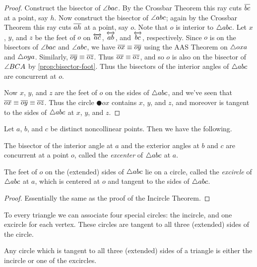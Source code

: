 \begin{proof}
Construct the bisector of \(\angle{bac}\).
By the Crossbar Theorem this ray cuts \(\overline{bc}\) at a point, say \(h\).
Now construct the bisector of \(\angle{abc}\); again by the Crossbar Theorem this ray cuts \(\overline{ah}\) at a point, say \(o\).
Note that \(o\) is interior to \(\bigtriangleup{abc}\).
Let \(x\), \(y\), and \(z\) be the feet of \(o\) on \(\overleftrightarrow{ac}\), \(\overleftrightarrow{ab}\), and \(\overleftrightarrow{bc}\), respectively.
Since \(o\) is on the bisectors of \(\angle{bac}\) and \(\angle{abc}\), we have \(\overline{ox} \equiv \overline{oy}\) using the AAS Theorem on \(\bigtriangleup{oxa}\) and \(\bigtriangleup{oya}\).
Similarly, \(\overline{oy} \equiv \overline{oz}\).
Thus \(\overline{ox} \equiv \overline{oz}\), and so \(o\) is also on the bisector of \(\angle{BCA}\) by \ref{prop:bisector-foot}.
Thus the bisectors of the interior angles of \(\bigtriangleup{abc}\) are concurrent at \(o\).

Now \(x\), \(y\), and \(z\) are the feet of \(o\) on the sides of \(\bigtriangleup{abc}\), and we've seen that \(\overline{ox} \equiv \overline{oy} \equiv \overline{oz}\).
Thus the circle \(\CIRCLE{o}{x}\) contains \(x\), \(y\), and \(z\), and moreover is tangent to the sides of \(\bigtriangleup{abc}\) at \(x\), \(y\), and \(z\).
\end{proof}

\begin{construct}
Let \(a\), \(b\), and \(c\) be distinct noncollinear points.
Then we have the following.
\begin{proplist}
\item The bisector of the interior angle at \(a\) and the exterior angles at \(b\) and \(c\) are concurrent at a point \(o\), called the \emph{excenter} of \(\bigtriangleup{abc}\) at \(a\).

\item The feet of \(o\) on the (extended) sides of \(\bigtriangleup{abc}\) lie on a circle, called the \emph{excircle} of \(\bigtriangleup{abc}\) at \(a\), which is centered at \(o\) and tangent to the sides of \(\bigtriangleup{abc}\).
\end{proplist}
\end{construct}

\begin{proof}
Essentially the same as the proof of the Incircle Theorem.
\end{proof}

To every triangle we can associate four special circles: the incircle, and one excircle for each vertex.
These circles are tangent to all three (extended) sides of the circle.

\begin{prop}
Any circle which is tangent to all three (extended) sides of a triangle is either the incircle or one of the excircles.
\end{prop}
